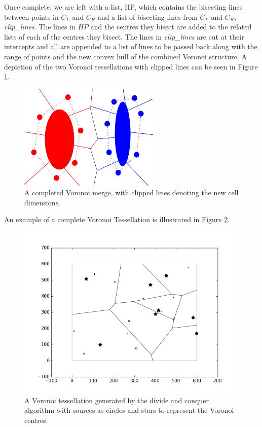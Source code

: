 Once complete, we are left with a list, HP, which contains the bisecting lines between points in $C_L$ and $C_R$ and a list of bisecting lines from $C_L$ and $C_R$, \textit{clip\_lines}. The lines in $HP$ and the centres they bisect are added to the related lists of each of the centres they bisect. The lines in \textit{clip\_lines} are cut at their intercepts and all are appended to a list of lines to be passed back along with the range of points and the new convex hull of the combined Voronoi structure. A depiction of the two Voronoi tessellations with clipped lines can be seen in Figure \ref{fig:v_merge5}.
\begin{figure}[H]
\centering
\includegraphics[width=0.6\textwidth]{Images/v_merge5.jpg}
\caption{A completed Voronoi merge, with clipped lines denoting the new cell dimensions.}
\label{fig:v_merge5}
\end{figure}
An example of a complete Voronoi Tessellation is illustrated in Figure \ref{fig:gen_voronoi}.
\begin{figure}[H]
\includegraphics[width=\textwidth]{Images/recentre1.png}
\caption{A Voronoi tessellation generated by the divide and conquer algorithm with sources as circles and stars to represent the Voronoi centres.}
\label{fig:gen_voronoi}
\end{figure}

